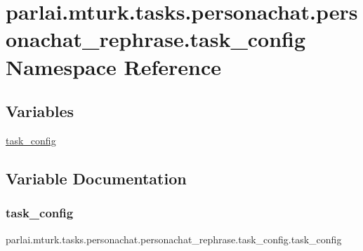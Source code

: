 \hypertarget{namespaceparlai_1_1mturk_1_1tasks_1_1personachat_1_1personachat__rephrase_1_1task__config}{}\section{parlai.\+mturk.\+tasks.\+personachat.\+personachat\+\_\+rephrase.\+task\+\_\+config Namespace Reference}
\label{namespaceparlai_1_1mturk_1_1tasks_1_1personachat_1_1personachat__rephrase_1_1task__config}
\subsection*{Variables}
\begin{DoxyCompactItemize}
\item 
\hyperlink{namespaceparlai_1_1mturk_1_1tasks_1_1personachat_1_1personachat__rephrase_1_1task__config_a72ffd8589a4010ecab010e37bc27b3fe}{task\+\_\+config}
\end{DoxyCompactItemize}


\subsection{Variable Documentation}
\mbox{\label{namespaceparlai_1_1mturk_1_1tasks_1_1personachat_1_1personachat__rephrase_1_1task__config_a72ffd8589a4010ecab010e37bc27b3fe}} 
\subsubsection{\texorpdfstring{task\+\_\+config}{task\_config}}
{\footnotesize\ttfamily parlai.\+mturk.\+tasks.\+personachat.\+personachat\+\_\+rephrase.\+task\+\_\+config.\+task\+\_\+config}

